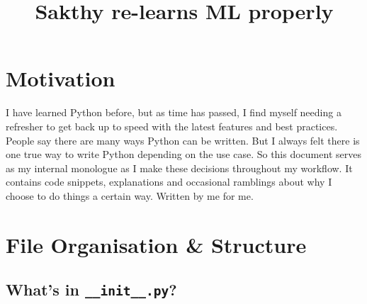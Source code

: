 \documentclass[11pt]{article}
\title{Sakthy re-learns ML properly}
\begin{document}
\maketitle
\tableofcontents
\newpage

\section{Motivation}
I have learned Python before, but as time has passed, I find myself needing a refresher to get back up to speed with the latest features and best practices. People say there are many ways Python can be written. But I always felt there is one true way to write Python depending on the use case. So this document serves as my internal monologue as I make these decisions throughout my workflow. It contains code snippets, explanations and occasional ramblings about why I choose to do things a certain way. Written by me for me.

\section{File Organisation \& Structure}

\subsection{What's in \texttt{\_\_init\_\_.py}?}
\end{document}
